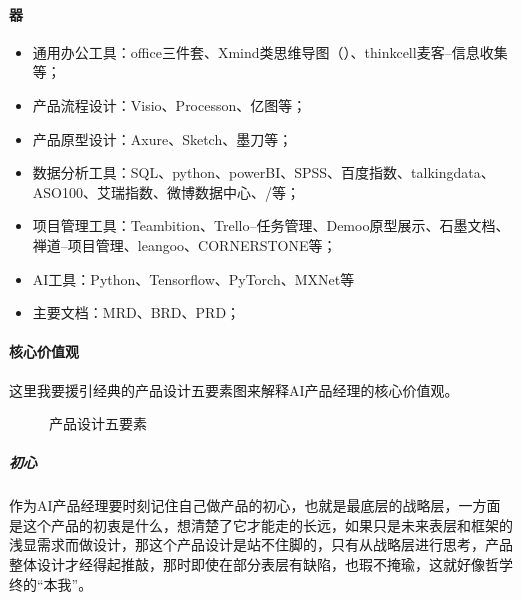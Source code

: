 \documentclass[letterpaper,10pt,english]{sphinxmanual}
\begin{document}
\paragraph{器}
\label{\detokenize{chapter_introduction/ability:id15}}\begin{itemize}
\item {} 
通用办公工具：office三件套、Xmind类思维导图（）、think\sphinxhyphen{}cell麦客–信息收集等；

\item {} 
产品流程设计：Visio、Processon、亿图等；

\item {} 
产品原型设计：Axure、Sketch、墨刀等；

\item {} 
数据分析工具：SQL、python、powerBI、SPSS、百度指数、talkingdata、ASO100、艾瑞指数、微博数据中心、/等；

\item {} 
项目管理工具：Teambition、Trello–任务管理、Demoo\sphinxhyphen{}原型展示、石墨文档、禅道–项目管理、leangoo、CORNERSTONE等；

\item {} 
AI工具：Python、Tensorflow、PyTorch、MXNet等

\item {} 
主要文档：MRD、BRD、PRD；

\end{itemize}


\paragraph{核心价值观}
\label{\detokenize{chapter_introduction/ability:id16}}
这里我要援引经典的产品设计五要素图来解释AI产品经理的核心价值观。

\begin{figure}[H]
\centering
\capstart

\noindent{}
\caption{产品设计五要素}\label{\detokenize{chapter_introduction/ability:id21}}\end{figure}


\subparagraph{初心}
\label{\detokenize{chapter_introduction/ability:id17}}
作为AI产品经理要时刻记住自己做产品的初心，也就是最底层的战略层，一方面是这个产品的初衷是什么，想清楚了它才能走的长远，如果只是未来表层和框架的浅显需求而做设计，那这个产品设计是站不住脚的，只有从战略层进行思考，产品整体设计才经得起推敲，那时即使在部分表层有缺陷，也瑕不掩瑜，这就好像哲学终的“本我”。
\end{document}
